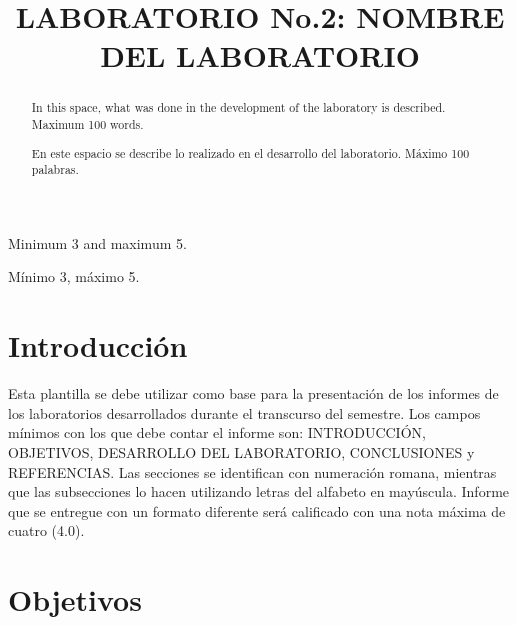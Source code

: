 \documentclass[conference]{IEEEtran}
\begin{document}
\title{LABORATORIO No.2: NOMBRE DEL LABORATORIO
}

\author{
\and
{}
}

\maketitle

\begin{abstract}
In this space, what was done in the development of the laboratory is described. Maximum 100 words.\\
\end{abstract}
\renewcommand\IEEEkeywordsname{Keywords}
\begin{IEEEkeywords}
Minimum 3 and maximum 5.\\
\end{IEEEkeywords}


\begin{abstract}
En este espacio se describe lo realizado en el desarrollo del laboratorio. Máximo 100 palabras.\\
\end{abstract}

\renewcommand\IEEEkeywordsname{Palabras Clave}
\begin{IEEEkeywords}
Mínimo 3, máximo 5.
\end{IEEEkeywords}


\section{Introducción}
Esta plantilla se debe utilizar como base para la presentación de los informes de los laboratorios desarrollados durante el transcurso del semestre. Los campos mínimos con los que debe contar el informe son: INTRODUCCIÓN, OBJETIVOS, DESARROLLO DEL LABORATORIO, CONCLUSIONES y REFERENCIAS. Las secciones se identifican con numeración romana, mientras que las subsecciones lo hacen utilizando letras del alfabeto en mayúscula. Informe que se entregue con un formato diferente será calificado con una nota máxima de cuatro (4.0). 

\section{Objetivos}
\end{document}
